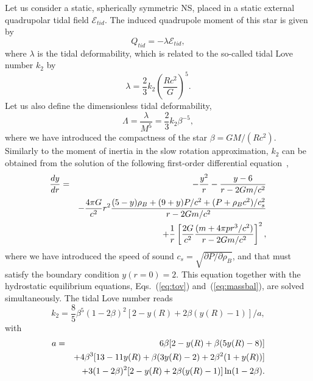 Let us consider a static, spherically symmetric NS, placed in a static external
quadrupolar tidal field $\mathcal{E}_{tid}$. The induced quadrupole moment of
this star is given by 
%
\begin{equation}
  Q_{tid} = -\lambda \mathcal{E}_{tid},
\end{equation}
%
where $\lambda$ is the tidal deformability, which is related to the so-called 
tidal Love number $k_2$ by
%
\begin{equation}
  \lambda = \frac{2}{3}k_2\left(\frac{Rc^2}{G}\right)^5.
\end{equation}
%
Let us also define the dimensionless tidal deformability,
%
\begin{equation}
  \Lambda = \frac{\lambda}{M^5} = \frac{2}{3}k_2\beta^{-5},
\end{equation}
%
where we have introduced the compactness of the star $\beta = GM/(Rc^2)$.
Similarly to the moment of inertia in the slow rotation approximation, $k_2$ 
can be obtained from the solution of the following first-order differential 
equation~\cite{Hinderer2010},
%
\begin{eqnarray}
  \frac{dy}{dr} &=& -\frac{y^2}{r} - \frac{y-6}{r-2Gm/c^2} \notag\\
                &&- \frac{4\pi G}{c^2}r^2\frac{(5-y)\rho_B + (9+y)P/c^2 
                + (P+\rho_Bc^2)/c_s^2}{r-2Gm/c^2} \notag\\
                &&+ \frac{1}{r}\left[\frac{2G}{c^2}\frac{(m+4\pi p r^3/c^2)}{r 
                - 2Gm/c^2}\right]^2\label{eq:dy},
\end{eqnarray}
%
where we have introduced the speed of sound $c_s = \sqrt{\partial P/\partial 
\rho_B}$, and that must satisfy the boundary condition $y(r=0)=2$. This
equation together with the hydrostatic equilibrium equations, 
Eqs.~(\ref{eq:tov}) and~(\ref{eq:massbal}), are solved simultaneously. The 
tidal Love number reads
%
\begin{equation}
  k_2 = \frac{8}{5}\beta^5(1-2\beta)^2[2-y(R) + 2\beta(y(R) - 1)]/a,
\end{equation}
%
with
%
\begin{eqnarray}
  a &=& 6\beta[2-y(R)+\beta(5y(R)-8)] \notag\\
    &&+ 4\beta^3[13-11y(R)+\beta(3y(R)-2)+2\beta^2(1+y(R))] \notag\\
    &&+ 3(1-2\beta)^2[2-y(R)+2\beta(y(R)-1)]\ln(1-2\beta).
\end{eqnarray}
%

